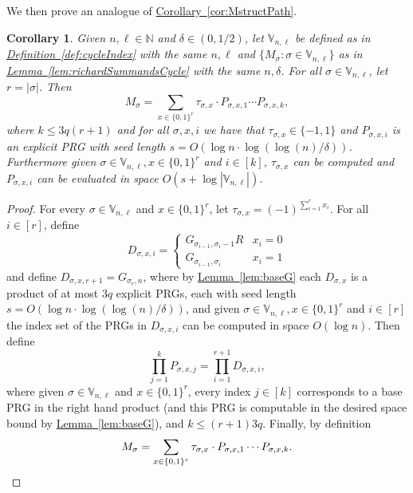 \documentclass[11pt]{article}
\numberwithin{equation}{section}
\newtheorem{corollary}[theorem]{Corollary}
\theoremstyle{definition}
\theoremstyle{plain}
\newcommand{\N}{\mathbb N}
\newcommand{\expref}[2]{\hyperref[#2]{#1~\ref{#2}}}
\newcommand{\zo}{\{0,1\}}
\newcommand{\vnl}{\mathbb{V}_{n,\ell}}
\begin{document}
We then prove an analogue of \expref{Corollary}{cor:MstructPath}.
\begin{corollary}\label{cor:MstructCycle}
Given $n,\ell \in  \N$ and $\delta \in (0,1/2)$, let $\vnl$ be defined as in \expref{Definition}{def:cycleIndex} with the same $n,\ell$ and $\{M_\sigma:\sigma\in\vnl\}$ as in \expref{Lemma}{lem:richardSummandsCycle} with the same $n,\delta$. For all $\sigma\in \vnl$, let $r=|\sigma|$. Then
\[M_\sigma=\sum_{x\in \zo^r}\tau_{\sigma,x}\cdot P_{\sigma,x,1}\cdots P_{\sigma,x,k},\]
where $k\leq 3q(r+1)$ and for all $\sigma,x,i$ we have that $\tau_{\sigma,x}\in \{-1,1\}$ and $P_{\sigma,x,i}$ is an explicit PRG with seed length $s=O(\log n\cdot\log(\log(n)/\delta))$.
Furthermore given $\sigma\in \vnl,x\in \zo^r$ and $i\in [k]$, $\tau_{\sigma,x}$ can be computed and $P_{\sigma,x,i}$ can be evaluated in space $O(s+\log|\vnl|)$.
\end{corollary}
\begin{proof}
For every $\sigma\in \vnl$ and $x\in \zo^{r}$, let $\tau_{\sigma,x}=(-1)^{\sum_{i=1}^{r}x_i}$. 
For all $i\in[r]$, define %
\[D_{\sigma,x,i} = \begin{cases}
G_{\sigma_{i-1},\sigma_i-1}R & x_i=0\\
G_{\sigma_{i-1},\sigma_i} & x_i=1
\end{cases}\]
and define $D_{\sigma,x,r+1}=G_{\sigma_{r},n}$, where by \expref{Lemma}{lem:baseG} each $D_{\sigma,x}$ is a product of at most $3q$ explicit PRGs, each with seed length $s=O(\log n\cdot\log(\log(n)/\delta))$, and given $\sigma\in \vnl,x\in \zo^r$ and $i\in[r]$ the index set of the PRGs in $D_{\sigma,x,i}$ can be computed in space $O(\log n)$. Then define %
$$\prod_{j=1}^kP_{\sigma,x,j}=\prod_{i=1}^{r+1}D_{\sigma,x,i},$$ 
where given $\sigma\in \vnl$ and $x\in \zo^r$, every index $j\in[k]$ corresponds to a base PRG in the right hand product (and this PRG is computable in the desired space bound by \expref{Lemma}{lem:baseG}), and $k\leq (r+1)3q$. Finally, by definition
\[M_\sigma=\sum_{x\in \zo^r}\tau_{\sigma,x}\cdot P_{\sigma,x,1}\cdots P_{\sigma,x,k}.\qedhere\]
\end{proof}
\end{document}
